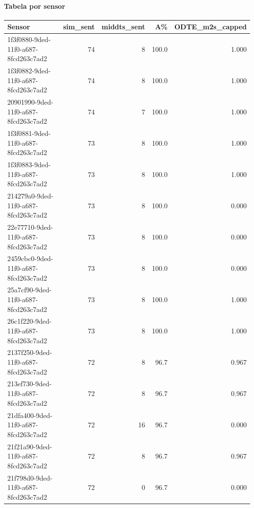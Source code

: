 \paragraph{Tabela por sensor}

\begin{longtable}{l r r r r}
	\textbf{Sensor} & \textbf{sim_sent} & \textbf{middts_sent} & \textbf{A\%} & \textbf{ODTE\_m2s\_capped} \\
\hline

1f3f0880-9ded-11f0-a687-8fcd263c7ad2 & 74 & 8 & 100.0 & 1.000 \\

1f3f0882-9ded-11f0-a687-8fcd263c7ad2 & 74 & 8 & 100.0 & 1.000 \\

20901990-9ded-11f0-a687-8fcd263c7ad2 & 74 & 7 & 100.0 & 1.000 \\

1f3f0881-9ded-11f0-a687-8fcd263c7ad2 & 73 & 8 & 100.0 & 1.000 \\

1f3f0883-9ded-11f0-a687-8fcd263c7ad2 & 73 & 8 & 100.0 & 1.000 \\

214279a0-9ded-11f0-a687-8fcd263c7ad2 & 73 & 8 & 100.0 & 0.000 \\

22e77710-9ded-11f0-a687-8fcd263c7ad2 & 73 & 8 & 100.0 & 0.000 \\

2459cbc0-9ded-11f0-a687-8fcd263c7ad2 & 73 & 8 & 100.0 & 0.000 \\

25a7cf90-9ded-11f0-a687-8fcd263c7ad2 & 73 & 8 & 100.0 & 1.000 \\

26c1f220-9ded-11f0-a687-8fcd263c7ad2 & 73 & 8 & 100.0 & 1.000 \\

2137f250-9ded-11f0-a687-8fcd263c7ad2 & 72 & 8 & 96.7 & 0.967 \\

213ef730-9ded-11f0-a687-8fcd263c7ad2 & 72 & 8 & 96.7 & 0.967 \\

21dfa400-9ded-11f0-a687-8fcd263c7ad2 & 72 & 16 & 96.7 & 0.000 \\

21f21a90-9ded-11f0-a687-8fcd263c7ad2 & 72 & 8 & 96.7 & 0.967 \\

21f798d0-9ded-11f0-a687-8fcd263c7ad2 & 72 & 0 & 96.7 & 0.000 \\


\end{longtable}
